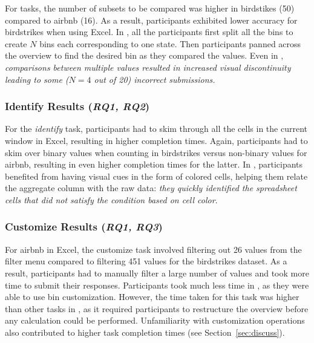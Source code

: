 For \cmpB tasks,
the number of subsets to be compared was 
higher in birdstikes (50) compared to airbnb (16). 
As a result,
participants exhibited lower accuracy for birdstrikes  
when using Excel.
In \noah, all the participants first split 
all the bins to create $N$ bins each corresponding to one state. 
Then participants panned across the overview 
to find the desired bin as they compared the values. 
Even in \noah, \emph{comparisons
between multiple values resulted in increased 
visual discontinuity leading to some ($N=4$ out of 20) incorrect submissions.}

\subsubsection{Identify Results (\emph{RQ1, RQ2})}
\vspace{-5pt}
For the \emph{identify} task, 
participants had to skim through all the cells 
in the current window in Excel, 
resulting in higher completion times. 
Again, participants had to skim over binary values when counting in 
birdstrikes versus non-binary values for airbnb, resulting in even higher completion times for the latter. 
In \noah, participants benefited from having visual cues in the form of colored cells, helping them relate the aggregate column with the raw data: \emph{they quickly identified the spreadsheet cells that did not satisfy the condition based on cell color}.
\subsubsection{Customize Results (\emph{RQ1, RQ3})}
\vspace{-5pt}
 For airbnb in Excel, the customize task involved filtering out 26 values from the filter menu compared to filtering 451
values for the birdstrikes dataset. As a result, participants had to manually filter a large number of values and took more time
to submit their responses. Participants took much less time in \noah, as they were able to use bin customization.
However, the time taken for this task was higher than  other tasks in \noah, as
it required participants to restructure the overview
before any calculation could be performed. Unfamiliarity with customization
operations also contributed to higher task completion times (see Section~\ref{sec:discuss}).

